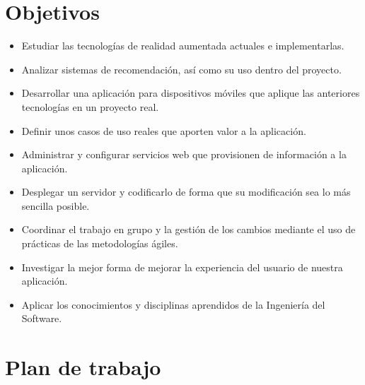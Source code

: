 \section{Objetivos}
\label{makereference1.2}
\begin{itemize}  
    \item Estudiar las tecnologías de realidad aumentada actuales e implementarlas.
    \item Analizar sistemas de recomendación, así como su uso dentro del proyecto.
    \item Desarrollar una aplicación para dispositivos móviles que aplique las anteriores tecnologías en un proyecto real.
    \item Definir unos casos de uso reales que aporten valor a la aplicación.
    \item Administrar y configurar servicios web que provisionen de información a la aplicación.
    \item Desplegar un servidor y codificarlo de forma que su modificación sea lo más sencilla posible.
    \item Coordinar el trabajo en grupo y la gestión de los cambios mediante el uso de prácticas de las metodologías ágiles.
    \item Investigar la mejor forma de mejorar la experiencia del usuario de nuestra aplicación.
    \item Aplicar los conocimientos y disciplinas aprendidos de la Ingeniería del Software.
\end{itemize}

\section{Plan de trabajo}
\label{makereference1.3}



